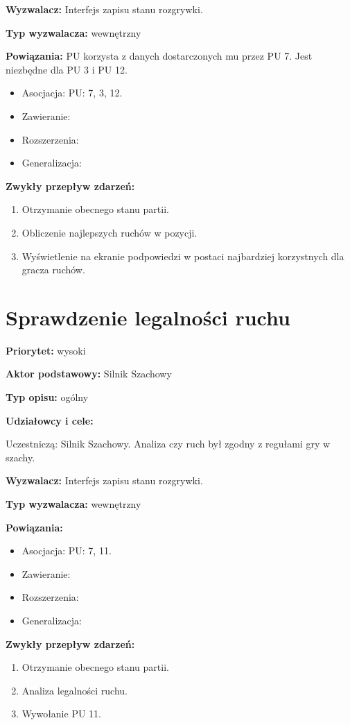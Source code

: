 \documentclass[12pt]{article}
\begin{document}
\textbf{Wyzwalacz:} Interfejs zapisu stanu rozgrywki.

\textbf{Typ wyzwalacza:} wewnętrzny

\textbf{Powiązania:} PU korzysta z danych dostarczonych mu przez PU 7. Jest niezbędne dla PU 3 i PU 12.
	\begin{itemize}\item Asocjacja: PU: 7, 3, 12.
	\item Zawieranie: 
	\item Rozszerzenia:
	\item Generalizacja:
\end{itemize} 

\textbf{Zwykły przepływ zdarzeń:}  
\begin{enumerate}
\item Otrzymanie obecnego stanu partii.
\item Obliczenie najlepszych ruchów w pozycji.
\item Wyświetlenie na ekranie podpowiedzi w postaci najbardziej korzystnych dla gracza ruchów.
\end{enumerate} 





\section{Sprawdzenie legalności ruchu}

\textbf{Priorytet:} wysoki

\textbf{Aktor podstawowy:} Silnik Szachowy

\textbf{Typ opisu:} ogólny

\textbf{Udziałowcy i cele:} 

Uczestniczą: Silnik Szachowy. Analiza czy ruch był zgodny z regułami gry w szachy.

\textbf{Wyzwalacz:} Interfejs zapisu stanu rozgrywki.

\textbf{Typ wyzwalacza:} wewnętrzny

\textbf{Powiązania:} 
	\begin{itemize}\item Asocjacja: PU: 7, 11.
	\item Zawieranie: 
	\item Rozszerzenia:
	\item Generalizacja:
\end{itemize} 
\textbf{Zwykły przepływ zdarzeń:}  
\begin{enumerate}
\item Otrzymanie obecnego stanu partii.
\item Analiza legalności ruchu.
\item Wywołanie PU 11.
\end{enumerate} 
\end{document}
